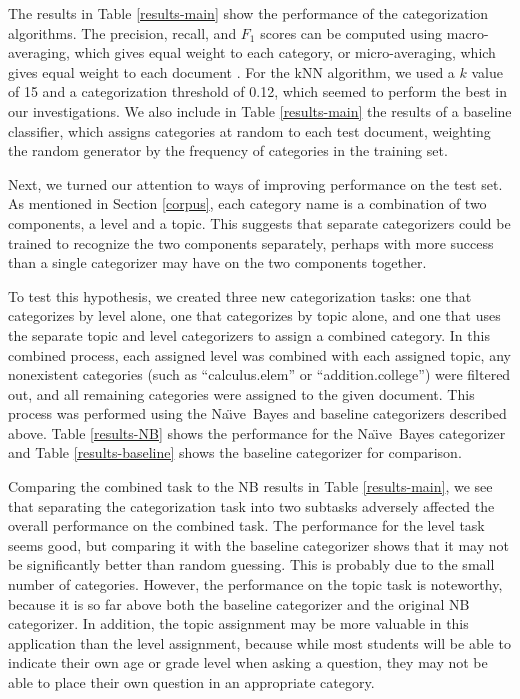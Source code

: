 \documentclass{ios}
\newcommand{\naive}{Na\"\i ve}
\begin{document}
The results in Table \ref{results-main} show the performance of the
categorization algorithms.  The precision, recall, and $F_1$ scores
can be computed using macro-averaging, which gives equal weight to
each category, or micro-averaging, which gives equal weight to each
document \cite{yang:99, sebastiani:02}. For the kNN algorithm, we used
a $k$ value of 15 and a categorization threshold of 0.12, which seemed
to perform the best in our investigations.  We also include in Table
\ref{results-main} the results of a baseline classifier, which assigns categories at
random to each test document, weighting the random generator by the
frequency of categories in the training set.

Next, we turned our attention to ways of improving performance on the
test set.  As mentioned in Section \ref{corpus}, each category name is
a combination of two components, a level and a topic.  This suggests
that separate categorizers could be trained to recognize the two
components separately, perhaps with more success than a single
categorizer may have on the two components together.

To test this hypothesis, we created three new categorization tasks:
one that categorizes by level alone, one that categorizes by topic
alone, and one that uses the separate topic and level categorizers to
assign a combined category.  In this combined process, each assigned
level was combined with each assigned topic, any nonexistent
categories (such as ``calculus.elem'' or ``addition.college'') were
filtered out, and all remaining categories were assigned to the given
document.  This process was performed using the \naive\ Bayes and
baseline categorizers described above.  Table \ref{results-NB} shows
the performance for the \naive\ Bayes categorizer and Table
\ref{results-baseline} shows the baseline categorizer for comparison.

Comparing the combined task to the NB results in Table
\ref{results-main}, we see that separating the categorization task
into two subtasks adversely affected the overall performance on the combined task.
The performance for the level task seems good, but comparing it with the baseline
categorizer shows that it may not be significantly better than random
guessing.  This is probably due to the small number of categories.
However, the performance on the topic task is noteworthy,
because it is so far above both the baseline categorizer and the
original NB categorizer.  In addition, the topic assignment may be
more valuable in this application than the level assignment, because while most students
will be able to indicate their own age or grade level when asking a
question, they may not be able to place their own question in an
appropriate category.
\end{document}
